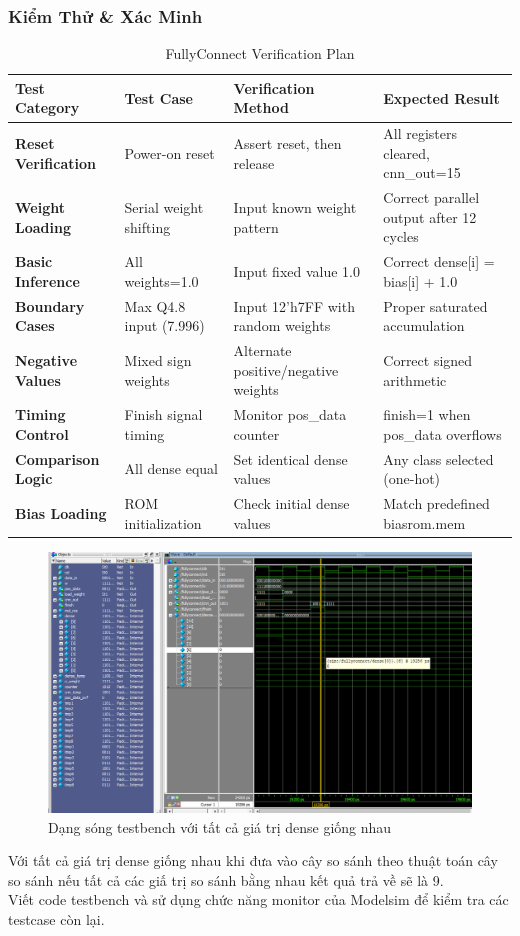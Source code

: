 \subsubsection{Kiểm Thử \& Xác Minh}
\begin{table}[H]
\centering
\caption{FullyConnect Verification Plan}
\begin{tabular}{>{\bfseries}p{2.5cm}p{4cm}p{4cm}p{3cm}}
\toprule
\textbf{Test Category} & \textbf{Test Case} & \textbf{Verification Method} & \textbf{Expected Result} \\
\midrule
Reset Verification & Power-on reset & Assert reset, then release & All registers cleared, cnn\_out=15 \\
\hline
Weight Loading & Serial weight shifting & Input known weight pattern & Correct parallel output after 12 cycles \\
\hline
Basic Inference & All weights=1.0 & Input fixed value 1.0 & Correct dense[i] = bias[i] + 1.0 \\
\hline
Boundary Cases & Max Q4.8 input (7.996) & Input 12'h7FF with random weights & Proper saturated accumulation \\
\hline
Negative Values & Mixed sign weights & Alternate positive/negative weights & Correct signed arithmetic \\
\hline
Timing Control & Finish signal timing & Monitor pos\_data counter & finish=1 when pos\_data overflows \\
\hline
Comparison Logic & All dense equal & Set identical dense values & Any class selected (one-hot) \\
\hline
Bias Loading & ROM initialization & Check initial dense values & Match predefined biasrom.mem \\
\bottomrule
\end{tabular}
\end{table}

\begin{figure}[H]
    \centering
    \includegraphics[width=0.9\linewidth]{Images/wavefc.png}
    \caption{Dạng sóng testbench với tất cả giá trị dense giống nhau}
    \label{fig:fc_wave}
\end{figure}
Với tất cả giá trị dense giống nhau khi đưa vào cây so sánh theo thuật toán cây so sánh nếu tất cả các giấ trị so sánh bằng nhau kết quả trả về sẽ là 9. \\
Viết code testbench và sử dụng chức năng monitor của Modelsim để kiểm tra các testcase
còn lại.

